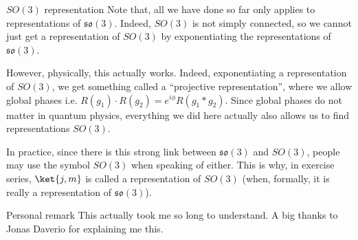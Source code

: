 \documentclass[a4paper]{article}
\begin{document}
\begin{parag}{$SO\left(3\right)$ representation}
    Note that, all we have done so far only applies to representations of $\mathfrak{so}\left(3\right)$. Indeed, $SO\left(3\right)$ is not simply connected, so we cannot just get a representation of $SO\left(3\right)$ by exponentiating the representations of $\mathfrak{so}\left(3\right)$.

    However, physically, this actually works. Indeed, exponentiating a representation of $SO\left(3\right)$, we get something called a ``projective representation'', where we allow global phases i.e. $R\left(g_1\right)\cdot R\left(g_2\right) = e^{i\phi} R\left(g_1 * g_2\right)$. Since global phases do not matter in quantum physics, everything we did here actually also allows us to find representations $SO\left(3\right)$.

    In practice, since there is this strong link between $\mathfrak{so}\left(3\right)$ and $SO\left(3\right)$, people may use the symbol $SO\left(3\right)$ when speaking of either. This is why, in exercise series, $\ket{j, m}$ is called a representation of $SO\left(3\right)$ (when, formally, it is really a representation of $\mathfrak{so}\left(3\right)$).

    \begin{subparag}{Personal remark}
        This actually took me so long to understand. A big thanks to Jonas Daverio for explaining me this.
    \end{subparag}
\end{parag}
\end{document}
